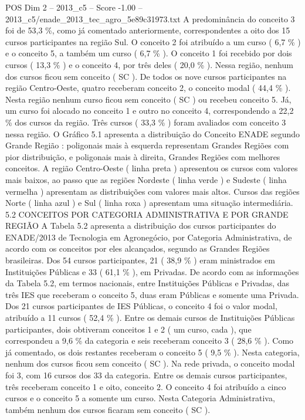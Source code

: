 \begin{textsample}{POS Dim 2 – 2013\_c5 – Score -1.00 – 2013\_c5/enade\_2013\_tec\_agro\_5e89c31973.txt}
A predominância do conceito 3 foi de 53,3 \%, como já comentado anteriormente, correspondentes a oito dos 15 cursos participantes na região Sul.
O conceito 2 foi atribuído a um curso ( 6,7 \% ) e o conceito 5, a também um curso ( 6,7 \% ).
O conceito 1 foi recebido por dois cursos ( 13,3 \% ) e o conceito 4, por três deles ( 20,0 \% ).
Nessa região, nenhum dos cursos ficou sem conceito ( SC ).
De todos os nove cursos participantes na região Centro-Oeste, quatro receberam conceito 2, o conceito modal ( 44,4 \% ).
Nesta região nenhum curso ficou sem conceito ( SC ) ou recebeu conceito 5.
Já, um curso foi alocado no conceito 1 e outro no conceito 4, correspondendo a 22,2 \% dos cursos da região.
Três cursos ( 33,3 \% ) foram avaliados com conceito 3 nessa região.
O Gráfico 5.1 apresenta a distribuição do Conceito ENADE segundo Grande Região : poligonais mais à esquerda representam Grandes Regiões com pior distribuição, e poligonais mais à direita, Grandes Regiões com melhores conceitos.
A região Centro-Oeste ( linha preta ) apresentou os cursos com valores mais baixos, ao passo que as regiões Nordeste ( linha verde ) e Sudeste ( linha vermelha ) apresentam as distribuições com valores mais altos.
Cursos das regiões Norte ( linha azul ) e Sul ( linha roxa ) apresentam uma situação intermediária. 5.2 CONCEITOS POR CATEGORIA ADMINISTRATIVA E POR GRANDE REGIÃO A Tabela 5.2 apresenta a distribuição dos cursos participantes do ENADE/2013 de Tecnologia em Agronegócio, por Categoria Administrativa, de acordo com os conceitos por eles alcançados, segundo as Grandes Regiões brasileiras.
Dos 54 cursos participantes, 21 ( 38,9 \% ) eram ministrados em Instituições Públicas e 33 ( 61,1 \% ), em Privadas.
De acordo com as informações da Tabela 5.2, em termos nacionais, entre Instituições Públicas e Privadas, das três IES que receberam o conceito 5, duas eram Públicas e somente uma Privada.
Dos 21 cursos participantes de IES Públicas, o conceito 4 foi o valor modal, atribuído a 11 cursos ( 52,4 \% ).
Entre os demais cursos de Instituições Públicas participantes, dois obtiveram conceitos 1 e 2 ( um curso, cada ), que correspondeu a 9,6 \% da categoria e seis receberam conceito 3 ( 28,6 \% ).
Como já comentado, os dois restantes receberam o conceito 5 ( 9,5 \% ).
Nesta categoria, nenhum dos cursos ficou sem conceito ( SC ).
Na rede privada, o conceito modal foi 3, com 16 cursos dos 33 da categoria.
Entre os demais cursos participantes, três receberam conceito 1 e oito, conceito 2.
O conceito 4 foi atribuído a cinco cursos e o conceito 5 a somente um curso.
Nesta Categoria Administrativa, também nenhum dos cursos ficaram sem conceito ( SC ).

\end{textsample}
